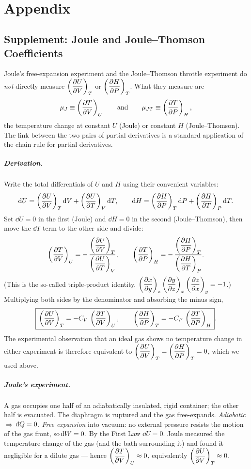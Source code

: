 \chapter{Appendix}
\section{Supplement: Joule and Joule--Thomson Coefficients} \label{sec:JT_coeff}

Joule's free-expansion experiment and the Joule--Thomson throttle experiment do \emph{not} directly measure $\left(\dfrac{\partial U}{\partial V}\right)_T$ or $\left(\dfrac{\partial H}{\partial P}\right)_T$. What they measure are
\[
    \mu_J \equiv \left(\dfrac{\partial T}{\partial V}\right)_U \qquad \text{and} \qquad \mu_{JT} \equiv \left(\dfrac{\partial T}{\partial P}\right)_H,
\]
the temperature change at constant $U$ (Joule) or constant $H$ (Joule--Thomson). The link between the two pairs of partial derivatives is a standard application of the chain rule for partial derivatives.

\paragraph{Derivation.} Write the total differentials of $U$ and $H$ using their convenient variables:
\[
    \mathrm{d} U = \left(\dfrac{\partial U}{\partial V}\right)_T \mathrm{d} V + \left(\dfrac{\partial U}{\partial T}\right)_V \mathrm{d} T,
    \qquad
    \mathrm{d} H = \left(\dfrac{\partial H}{\partial P}\right)_T \mathrm{d} P + \left(\dfrac{\partial H}{\partial T}\right)_P \mathrm{d} T.
\]
Set $\dd U = 0$ in the first (Joule) and $\dd H = 0$ in the second (Joule--Thomson), then move the $\dd T$ term to the other side and divide:
\[
    \left(\dfrac{\partial T}{\partial V}\right)_U = -\,\frac{\left(\dfrac{\partial U}{\partial V}\right)_T}{\left(\dfrac{\partial U}{\partial T}\right)_V},
    \qquad
    \left(\dfrac{\partial T}{\partial P}\right)_H = -\,\frac{\left(\dfrac{\partial H}{\partial P}\right)_T}{\left(\dfrac{\partial H}{\partial T}\right)_P}.
\]
(This is the so-called triple-product identity, $\left(\dfrac{\partial x}{\partial y}\right)_z \left(\dfrac{\partial y}{\partial z}\right)_x \left(\dfrac{\partial z}{\partial x}\right)_y = -1$.) Multiplying both sides by the denominator and absorbing the minus sign,
\[
    \boxed{\,\left(\dfrac{\partial U}{\partial V}\right)_T = -C_V\,\left(\dfrac{\partial T}{\partial V}\right)_U,\qquad \left(\dfrac{\partial H}{\partial P}\right)_T = -C_P\,\left(\dfrac{\partial T}{\partial P}\right)_H\,}.
\]
The experimental observation that an ideal gas shows no temperature change in either experiment is therefore equivalent to $\left(\dfrac{\partial U}{\partial V}\right)_T = \left(\dfrac{\partial H}{\partial P}\right)_T = 0$, which we used above.

\paragraph{Joule's experiment.}
A gas occupies one half of an adiabatically insulated, rigid container; the other half is evacuated. The diaphragm is ruptured and the gas free-expands. \emph{Adiabatic} $\Rightarrow$ $\dbar Q = 0$. \emph{Free expansion} into vacuum: no external pressure resists the motion of the gas front, so $\dbar W = 0$. By the First Law $\dd U = 0$. Joule measured the temperature change of the gas (and the bath surrounding it) and found it negligible for a dilute gas --- hence $\left(\dfrac{\partial T}{\partial V}\right)_U \approx 0$, equivalently $\left(\dfrac{\partial U}{\partial V}\right)_T \approx 0$.

